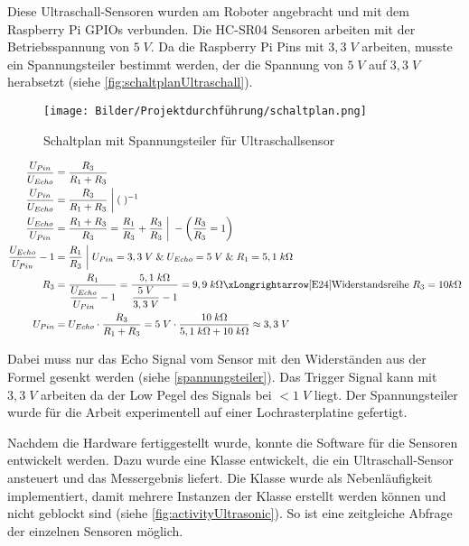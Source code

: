 Diese Ultraschall-Sensoren wurden am Roboter angebracht und mit dem Raspberry Pi GPIOs verbunden. Die HC-SR04 Sensoren arbeiten mit der Betriebsspannung von $5\; V$. Da die Raspberry Pi Pins mit $3,3\; V$ arbeiten, musste ein Spannungsteiler bestimmt werden, der die Spannung von $5\; V$ auf $3,3\; V$ herabsetzt (siehe \autoref{fig:schaltplanUltraschall}).  

\begin{figure}[H]
 \centering
 \texttt{[image: Bilder/Projektdurchführung/schaltplan.png]}
 \caption{Schaltplan mit Spannungsteiler für Ultraschallsensor}
 \label{fig:schaltplanUltraschall}
\end{figure}

\begin{align}\label{spannungsteiler}
\centering
\dfrac{U_{Pin}}{U_{Echo}}  &= \dfrac{R_{3}}{R_{1} + R_{3}} \\
\dfrac{U_{Pin}}{U_{Echo}} &= \dfrac{R_{3}}{R_{1} + R_{3}} \; \bigg \vert\; (\;)^{-1} \\
\dfrac{U_{Echo}}{U_{Pin}} &= \dfrac{R_{1} + R_{3}}{R_{3}} = \dfrac{R_{1}}{R_{3}} + \dfrac{R_{3}}{R_{3}} \; \bigg \vert\; - \left(\dfrac{R_{3}}{R_{3}} = 1\right) \\
\dfrac{U_{Echo}}{U_{Pin}} - 1 &= \dfrac{R_{1}}{R_{3}} \;\bigg \vert\; U_{Pin} = 3,3\;V \;\&\; U_{Echo}=5\;V \;\&\; R_{1} = 5,1\; k\Omega \\
R_{3} &= \dfrac{R_{1}}{\dfrac{U_{Echo}}{U_{Pin}} - 1 } = \dfrac{5,1\; k\Omega}{\dfrac{5\; V}{3,3\; V} - 1 } = 9,9\; k\Omega \xLongrightarrow[\text{E24}]{\text{Widerstandsreihe }} R_{3} = 10 k\Omega\\
U_{Pin} &= U_{Echo} \cdot \dfrac{R_{3}}{R_{1} + R_{3}} = 5\; V \cdot \dfrac{10\; k\Omega}{5,1\; k\Omega + 10\; k\Omega} \approx 3,3\; V
\end{align}

Dabei muss nur das Echo Signal vom Sensor mit den Widerständen aus der Formel gesenkt werden (siehe \autoref{spannungsteiler}). Das Trigger Signal kann mit $3,3\; V$ arbeiten da der Low Pegel des Signals bei $< 1\; V$ liegt. Der Spannungsteiler wurde für die Arbeit experimentell auf einer Lochrasterplatine gefertigt.  

Nachdem die Hardware fertiggestellt wurde, konnte die Software für die Sensoren entwickelt werden. Dazu wurde eine Klasse entwickelt, die ein Ultraschall-Sensor ansteuert und das Messergebnis liefert. Die Klasse wurde als Nebenläufigkeit implementiert, damit mehrere Instanzen der Klasse erstellt werden können und nicht geblockt sind (siehe \autoref{fig:activityUltrasonic}). So ist eine zeitgleiche Abfrage der einzelnen Sensoren möglich.   

